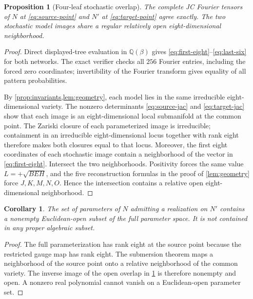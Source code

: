 \documentclass[11pt]{article}
\newtheorem{proposition}[theorem]{Proposition}
\newtheorem{corollary}[theorem]{Corollary}
\theoremstyle{remark}
\begin{document}
\begin{proposition}[Four-leaf stochastic overlap]\label{prop:overlap}
The complete JC Fourier tensors of $N$ at \eqref{eq:source-point} and $N'$
at \eqref{eq:target-point} agree exactly.  The two stochastic model images
share a regular relatively open eight-dimensional neighborhood.
\end{proposition}

\begin{proof}
Direct displayed-tree evaluation in $\mathbb Q(\beta)$ gives
\eqref{eq:first-eight}--\eqref{eq:last-six} for both networks.  The exact
verifier checks all $256$ Fourier entries, including the forced zero
coordinates; invertibility of the Fourier transform gives equality of all
pattern probabilities.

By \cref{prop:invariants,lem:geometry}, each model lies in the same
irreducible eight-dimensional variety.  The nonzero determinants
\eqref{eq:source-jac} and \eqref{eq:target-jac} show that each image is an
eight-dimensional local submanifold at the common point.  The Zariski closure
of each parameterized image is irreducible; containment in an irreducible
eight-dimensional locus together with rank eight therefore makes both
closures equal to that locus.  Moreover, the first eight coordinates of each
stochastic image contain a neighborhood of the vector in
\eqref{eq:first-eight}.  Intersect the two neighborhoods.  Positivity forces
the same value $L=+\sqrt{BEH}$, and the five reconstruction formulas in the
proof of \cref{lem:geometry} force $J,K,M,N,O$.  Hence the intersection
contains a relative open
eight-dimensional neighborhood.
\end{proof}

\begin{corollary}\label{cor:generic-failure}
The set of parameters of $N$ admitting a realization on $N'$ contains a
nonempty Euclidean-open subset of the full parameter space.  It is not
contained in any proper algebraic subset.
\end{corollary}

\begin{proof}
The full parameterization has rank eight at the source point because the
restricted gauge map has rank eight.  The submersion theorem maps a
neighborhood of the source point onto a relative neighborhood of the common
variety.  The inverse image of the open overlap in \cref{prop:overlap} is
therefore nonempty and open.  A nonzero real polynomial cannot vanish on a
Euclidean-open parameter set.
\end{proof}
\end{document}
